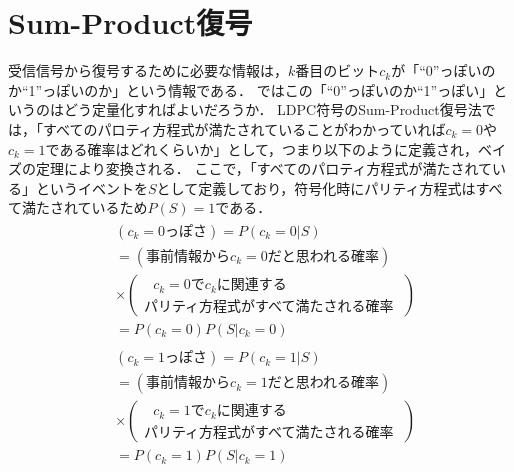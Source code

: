 \documentclass[twocolumn, a4paper]{ieicejsp}
\newcommand{\brkts}[1]{\left(#1\right)}
\begin{document}
\section{Sum-Product復号}


受信信号から復号するために必要な情報は，$k$番目のビット$c_k$が「``0''っぽいのか``1''っぽいのか」という情報である．
ではこの「``0''っぽいのか``1''っぽい」というのはどう定量化すればよいだろうか．
LDPC符号のSum-Product復号法では，「すべてのパロティ方程式が満たされていることがわかっていれば$c_k=0$や$c_k=1$である確率はどれくらいか」として，つまり以下のように定義され，ベイズの定理により変換される．
ここで，「すべてのパロティ方程式が満たされている」というイベントを$S$として定義しており，符号化時にパリティ方程式はすべて満たされているため$P(S)=1$である．
\begin{align}
  \begin{split}
    &\brkts{\text{$c_k=0$っぽさ}} = P(c_k=0 | S) \\
    &= \brkts{\text{事前情報から$c_k=0$だと思われる確率}}\\
    &\times \brkts{\begin{array}{l}
      \text{ $c_k=0$で$c_k$に関連する}\\
      \text{パリティ方程式がすべて満たされる確率 }
    \end{array}} \\
    &= P(c_k=0) P(S | c_k=0)
  \end{split}  \label{eq:P0}
\end{align}
\begin{align}
  \begin{split}
    &\brkts{\text{$c_k=1$っぽさ}} = P(c_k=1 | S) \\
    &= \brkts{\text{事前情報から$c_k=1$だと思われる確率}} \\
    &\times \brkts{\begin{array}{l}
      \text{ $c_k=1$で$c_k$に関連する} \\
      \text{パリティ方程式がすべて満たされる確率 }
    \end{array}} \\
    &= P(c_k=1) P(S | c_k=1)
  \end{split} \label{eq:P1}
\end{align}
\end{document}
